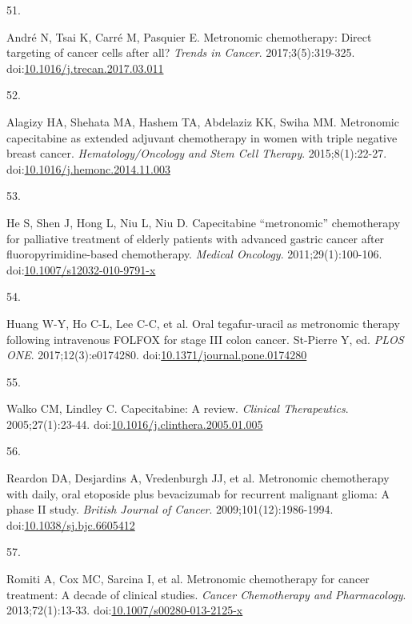 \documentclass[11pt]{umnthesis}
\newlength{\csllabelwidth}
\newlength{\cslhangindent}
\newenvironment{CSLReferences}[2] %
 {%
  \setlength{\parindent}{0pt}
  \ifodd #1 \everypar{\setlength{\hangindent}{\cslhangindent}}\ignorespaces\fi
  \ifnum #2 > 0
  \setlength{\parskip}{#2\baselineskip}
  \fi
 }%
 {}
\newcommand{\CSLLeftMargin}[1]{\parbox[t]{\csllabelwidth}{#1}}
\newcommand{\CSLRightInline}[1]{\parbox[t]{\linewidth - \csllabelwidth}{#1}}
\begin{document}
\begin{CSLReferences}{0}{0}
\leavevmode{}%
\CSLLeftMargin{51. }
\CSLRightInline{André N, Tsai K, Carré M, Pasquier E. Metronomic chemotherapy: Direct targeting of cancer cells after all? \emph{Trends in Cancer}. 2017;3(5):319-325. doi:\href{https://doi.org/10.1016/j.trecan.2017.03.011}{10.1016/j.trecan.2017.03.011}}

\leavevmode{}%
\CSLLeftMargin{52. }
\CSLRightInline{Alagizy HA, Shehata MA, Hashem TA, Abdelaziz KK, Swiha MM. Metronomic capecitabine as extended adjuvant chemotherapy in women with triple negative breast cancer. \emph{Hematology/Oncology and Stem Cell Therapy}. 2015;8(1):22-27. doi:\href{https://doi.org/10.1016/j.hemonc.2014.11.003}{10.1016/j.hemonc.2014.11.003}}

\leavevmode{}%
\CSLLeftMargin{53. }
\CSLRightInline{He S, Shen J, Hong L, Niu L, Niu D. Capecitabine {``}metronomic{''} chemotherapy for palliative treatment of elderly patients with advanced gastric cancer after fluoropyrimidine-based chemotherapy. \emph{Medical Oncology}. 2011;29(1):100-106. doi:\href{https://doi.org/10.1007/s12032-010-9791-x}{10.1007/s12032-010-9791-x}}

\leavevmode{}%
\CSLLeftMargin{54. }
\CSLRightInline{Huang W-Y, Ho C-L, Lee C-C, et al. Oral tegafur-uracil as metronomic therapy following intravenous {FOLFOX} for stage {III} colon cancer. St-Pierre Y, ed. \emph{{PLOS} {ONE}}. 2017;12(3):e0174280. doi:\href{https://doi.org/10.1371/journal.pone.0174280}{10.1371/journal.pone.0174280}}

\leavevmode{}%
\CSLLeftMargin{55. }
\CSLRightInline{Walko CM, Lindley C. Capecitabine: A review. \emph{Clinical Therapeutics}. 2005;27(1):23-44. doi:\href{https://doi.org/10.1016/j.clinthera.2005.01.005}{10.1016/j.clinthera.2005.01.005}}

\leavevmode{}%
\CSLLeftMargin{56. }
\CSLRightInline{Reardon DA, Desjardins A, Vredenburgh JJ, et al. Metronomic chemotherapy with daily, oral etoposide plus bevacizumab for recurrent malignant glioma: A phase {II} study. \emph{British Journal of Cancer}. 2009;101(12):1986-1994. doi:\href{https://doi.org/10.1038/sj.bjc.6605412}{10.1038/sj.bjc.6605412}}

\leavevmode{}%
\CSLLeftMargin{57. }
\CSLRightInline{Romiti A, Cox MC, Sarcina I, et al. Metronomic chemotherapy for cancer treatment: A decade of clinical studies. \emph{Cancer Chemotherapy and Pharmacology}. 2013;72(1):13-33. doi:\href{https://doi.org/10.1007/s00280-013-2125-x}{10.1007/s00280-013-2125-x}}


\end{CSLReferences}
\end{document}

